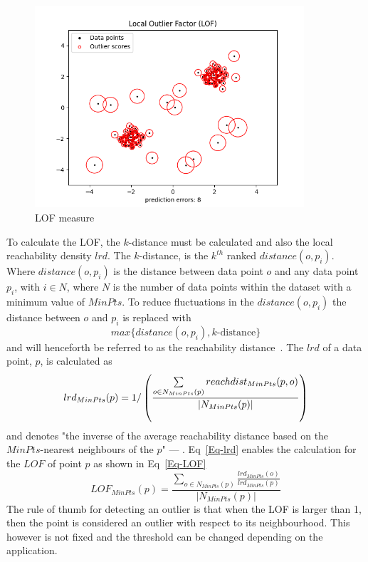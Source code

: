 \begin{figure}[h!tb]
	\centering
	
	\includegraphics[width=10cm]{fig/LOF_measure} %
	
	\caption[Local outlier measure]{LOF measure}
	\label{Figure-LOF_measure} 
\end{figure}

To calculate the LOF, the $k$-distance must be calculated and also the local reachability density \(lrd\). The $k$-distance, is the $k^{th}$ ranked $distance(o,p_i)$. Where $distance(o,p_i)$ is the distance between data point $o$ and any data point $p_i$, with $i \in N$, where $N$ is the number of data points within the dataset with a minimum value of $MinPts$. To reduce fluctuations in the $distance(o,p_i)$ the distance between $o$ and $p_i$ is replaced with 
\begin{equation}
max \{distance(o,p_i), k\text{-distance}\} 
\end{equation}
and will henceforth be referred to as the reachability distance~\cite{breunig2000lof}. The $lrd$ of a data point, $p$, is calculated as 
\begin{equation}
lrd_{MinPts}(p) = 1/\left(\frac{\sum\limits_{o \in N_{MinPts}(p)}^{} reach\-dist_{MinPts}(p,o)}{|N_{MinPts}(p)|}\right)
\label{Eq-lrd}
\end{equation}
and denotes "the inverse of the average reachability distance based on the $MinPts$-nearest neighbours of the $p$" --- \textcite{breunig2000lof}. Eq~\ref{Eq-lrd} enables the calculation for the $LOF$ of point $p$ as shown in Eq~\ref{Eq-LOF}
\begin{equation}
LOF_{MinPts}(p) = \frac{\sum\limits_{o \in N_{MinPts}(p)}^{}\frac{lrd_{MinPts}(o)}{lrd_{MinPts}(p)}}{|N_{MinPts}(p)|}
\label{Eq-LOF}
\end{equation}
The rule of thumb for detecting an outlier is that when the LOF is larger than 1, then the point is considered an outlier with respect to its neighbourhood. This however is not fixed and the threshold can be changed depending on the application.
 
